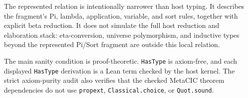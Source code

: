 The represented relation is intentionally narrower than host typing. It
describes the fragment's Pi, lambda, application, variable, and sort rules,
together with explicit beta reduction. It does not simulate the full host
reduction and elaboration stack: eta-conversion, universe polymorphism, and
inductive types beyond the represented Pi/Sort fragment are outside this local
relation.

The main sanity condition is proof-theoretic. \texttt{HasType} is axiom-free,
and each displayed \texttt{HasType} derivation is a Lean term checked by the
host kernel. The strict axiom-purity audit also verifies that the checked
MetaCIC theorem dependencies do not use \texttt{propext},
\texttt{Classical.choice}, or \texttt{Quot.sound}.

